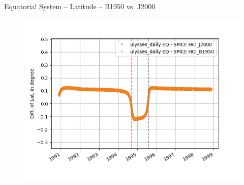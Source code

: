 \documentclass{beamer}
\begin{document}
\begin{frame}{Equatorial System -- Latitude --  B1950 vs. J2000}
\begin{figure}									
	\includegraphics[width=1\textwidth]{Pics/EQ_LAT_J_B.png}
\end{figure}
\end{frame}
\end{document}
